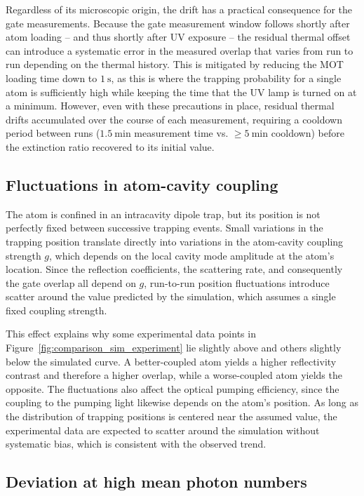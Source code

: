 Regardless of its microscopic origin, the drift has a practical consequence for the gate measurements. Because the gate measurement window follows shortly after atom loading -- and thus shortly after UV exposure -- the residual thermal offset can introduce a systematic error in the measured overlap that varies from run to run depending on the thermal history. This is mitigated by reducing the MOT loading time down to $\SI{1}{\second}$, as this is where the trapping probability for a single atom is sufficiently high while keeping the time that the UV lamp is turned on at a minimum.
However, even with these precautions in place, residual thermal drifts accumulated over the course of each measurement, requiring a cooldown period between runs ($\SI{1.5}{\minute}$ measurement time vs. ${\geq}\SI{5}{\minute}$ cooldown) before the extinction ratio recovered to its initial value.

\subsection{Fluctuations in atom-cavity coupling}
\label{subsubsec:coupling_fluctuations}

The atom is confined in an intracavity dipole trap, but its position is not perfectly fixed between successive trapping events. Small variations in the trapping position translate directly into variations in the atom-cavity coupling strength $g$, which depends on the local cavity mode amplitude at the atom's location. Since the reflection coefficients, the scattering rate, and consequently the gate overlap all depend on $g$, run-to-run position fluctuations introduce scatter around the value predicted by the simulation, which assumes a single fixed coupling strength.

This effect explains why some experimental data points in Figure~\ref{fig:comparison_sim_experiment} lie slightly above and others slightly below the simulated curve. A better-coupled atom yields a higher reflectivity contrast and therefore a higher overlap, while a worse-coupled atom yields the opposite. The fluctuations also affect the optical pumping efficiency, since the coupling to the pumping light likewise depends on the atom's position. As long as the distribution of trapping positions is centered near the assumed value, the experimental data are expected to scatter around the simulation without systematic bias, which is consistent with the observed trend.


\subsection{Deviation at high mean photon numbers}
\label{subsubsec:high_photon_deviation}

